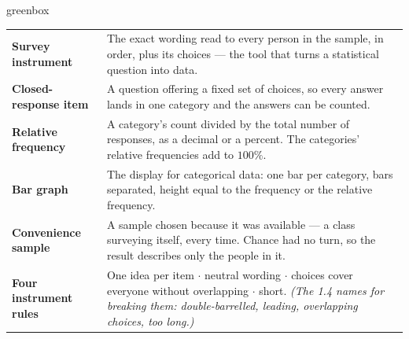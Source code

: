 \documentclass[10pt]{article}
\begin{document}
\boxguard[24]
\begin{skillbox}{greenbox}
\small
\renewcommand{\arraystretch}{1.35}
\begin{tabularx}{\linewidth}{@{} >{\bfseries}p{3.1cm} X @{}}
Survey instrument & The exact wording read to every person in the sample, in order, plus its
       choices --- the tool that turns a statistical question into data. \\
Closed-response item & A question offering a fixed set of choices, so every answer lands in one
       category and the answers can be counted. \\
Relative frequency & A category's count divided by the total number of responses, as a decimal or
       a percent. The categories' relative frequencies add to $100\%$. \\
Bar graph & The display for categorical data: one bar per category, bars separated, height equal
       to the frequency or the relative frequency. \\
Convenience sample & A sample chosen because it was available --- a class surveying itself, every
       time. Chance had no turn, so the result describes only the people in it. \\
Four instrument rules & One idea per item $\cdot$ neutral wording $\cdot$ choices cover everyone
       without overlapping $\cdot$ short. \emph{(The 1.4 names for breaking them: double-barrelled,
       leading, overlapping choices, too long.)} \\
\end{tabularx}
\end{skillbox}
\end{document}
